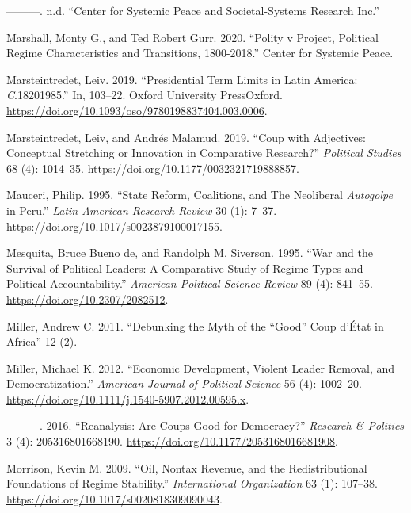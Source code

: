 \documentclass[
  12pt,
]{report}
\newlength{\cslhangindent}
\newenvironment{CSLReferences}[2] %
 {\begin{list}{}{%
  \setlength{\itemindent}{0pt}
  \setlength{\leftmargin}{0pt}
  \setlength{\parsep}{0pt}
  \ifodd #1
   \setlength{\leftmargin}{\cslhangindent}
   \setlength{\itemindent}{-1\cslhangindent}
  \fi
  \setlength{\itemsep}{#2\baselineskip}}}
 {\end{list}}
\begin{document}
\begin{CSLReferences}{1}{0}
---------. n.d. {``Center for Systemic Peace and Societal-Systems
Research Inc.''}

Marshall, Monty G., and Ted Robert Gurr. 2020. {``Polity v Project,
Political Regime Characteristics and Transitions, 1800-2018.''} Center
for Systemic Peace.

Marsteintredet, Leiv. 2019. {``Presidential Term Limits in Latin
America: {\emph{C}}.1820{\textendash}1985.''} In, 103--22. Oxford
University PressOxford.
\url{https://doi.org/10.1093/oso/9780198837404.003.0006}.

Marsteintredet, Leiv, and Andrés Malamud. 2019. {``Coup with Adjectives:
Conceptual Stretching or Innovation in Comparative Research?''}
\emph{Political Studies} 68 (4): 1014--35.
\url{https://doi.org/10.1177/0032321719888857}.

Mauceri, Philip. 1995. {``State Reform, Coalitions, and The Neoliberal
{\emph{Autogolpe}} in Peru.''} \emph{Latin American Research Review} 30
(1): 7--37. \url{https://doi.org/10.1017/s0023879100017155}.

Mesquita, Bruce Bueno de, and Randolph M. Siverson. 1995. {``War and the
Survival of Political Leaders: A Comparative Study of Regime Types and
Political Accountability.''} \emph{American Political Science Review} 89
(4): 841--55. \url{https://doi.org/10.2307/2082512}.

Miller, Andrew C. 2011. {``Debunking the Myth of the {``}Good{''} Coup
d{'}État in Africa''} 12 (2).

Miller, Michael K. 2012. {``Economic Development, Violent Leader
Removal, and Democratization.''} \emph{American Journal of Political
Science} 56 (4): 1002--20.
\url{https://doi.org/10.1111/j.1540-5907.2012.00595.x}.

---------. 2016. {``Reanalysis: Are Coups Good for Democracy?''}
\emph{Research \& Politics} 3 (4): 205316801668190.
\url{https://doi.org/10.1177/2053168016681908}.

Morrison, Kevin M. 2009. {``Oil, Nontax Revenue, and the
Redistributional Foundations of Regime Stability.''} \emph{International
Organization} 63 (1): 107--38.
\url{https://doi.org/10.1017/s0020818309090043}.


\end{CSLReferences}
\end{document}
